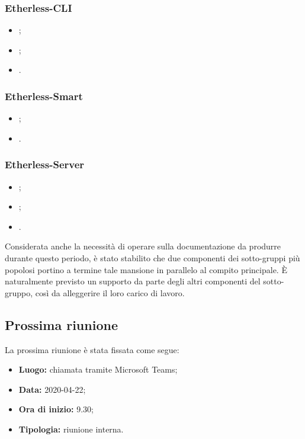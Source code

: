 	\subsubsection*{Etherless-CLI}
	\begin{itemize}
		\item \EG{};
		\item \FJ{};
		\item \MP{}.
	\end{itemize}
	\subsubsection*{Etherless-Smart}
	\begin{itemize}
		\item \VB{};
		\item \NF{}.
	\end{itemize}
	\subsubsection*{Etherless-Server}
	\begin{itemize}
		\item \LB{};
		\item \AS{};
		\item \AZ{}.
	\end{itemize}
	\pagebreak %
	
	\noindent Considerata anche la necessità di operare sulla documentazione da produrre durante questo periodo, è stato stabilito che due componenti dei sotto-gruppi più popolosi portino a termine tale mansione in parallelo al compito principale. È naturalmente previsto un supporto da parte degli altri componenti del sotto-gruppo, così da alleggerire il loro carico di lavoro.
	\subsection{Prossima riunione}
		La prossima riunione è stata fissata come segue:
		\begin{itemize}
			\item \textbf{Luogo: } chiamata tramite Microsoft Teams;
			\item \textbf{Data: } 2020-04-22;
			\item \textbf{Ora di inizio: } 9.30;
			\item \textbf{Tipologia: } riunione interna.
		\end{itemize}
